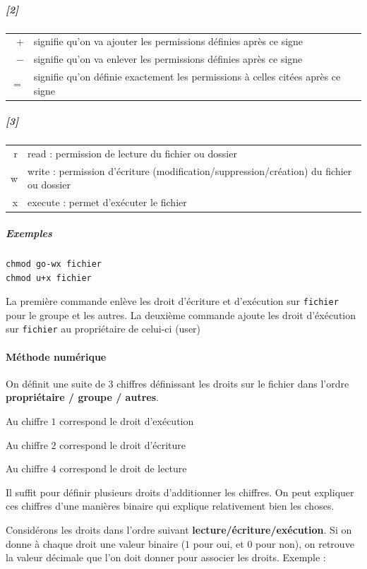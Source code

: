 \documentclass[a4paper,twoside]{article}
\begin{document}
\subparagraph{[2]}
\begin{tabular}{rl}
$+$ & signifie qu'on va ajouter les permissions définies après ce signe\\
$-$ & signifie qu'on va enlever les permissions définies après ce signe\\
$=$ & signifie qu'on définie exactement les permissions à celles citées après ce signe
\end{tabular}

\subparagraph{[3]}

\begin{tabular}{rl}
r & read : permission de lecture du fichier ou dossier\\
w & write : permission d'écriture (modification/suppression/création) du fichier ou dossier\\
x & execute : permet d'exécuter le fichier
\end{tabular}

\subparagraph{Exemples}

\begin{verbatim}
chmod go-wx fichier
chmod u+x fichier
\end{verbatim}

La première commande enlève les droit d'écriture et d'exécution sur \texttt{fichier} pour le groupe et les autres. La deuxième commande ajoute les droit d'éxécution sur \texttt{fichier} au propriétaire de celui-ci (user)

\paragraph{Méthode numérique}
On définit une suite de 3 chiffres définissant les droits sur le fichier dans l'ordre \textbf{propriétaire / groupe / autres}.

Au chiffre $1$ correspond le droit d'exécution

Au chiffre $2$ correspond le droit d'écriture

Au chiffre $4$ correspond le droit de lecture

Il suffit pour définir plusieurs droits d'additionner les chiffres. On peut expliquer ces chiffres d'une manières binaire qui explique relativement bien les choses.

Considérons les droits dans l'ordre suivant \textbf{lecture/écriture/exécution}. Si on donne à chaque droit une valeur binaire ($1$ pour oui, et $0$ pour non), on retrouve la valeur décimale que l'on doit donner pour associer les droits. Exemple :
\end{document}
